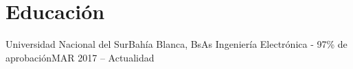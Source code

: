 \section{Educación}
  \resumeSubHeadingListStart
    \resumeSubheading
      {Universidad Nacional del Sur}{Bahía Blanca, BsAs}
      {Ingeniería Electrónica - 97\% de aprobación}{MAR 2017 -- Actualidad}
\resumeSubHeadingListEnd